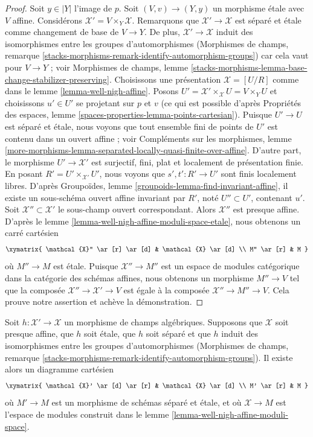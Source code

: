 \begin{proof}
\medskip\noindent
Soit $y \in |Y|$ l'image de $p$.
Soit $(V, v) \to (Y, y)$ un morphisme \'etale avec $V$ affine.
Considérons $\mathcal{X}' = V \times_Y \mathcal{X}$.
Remarquons que $\mathcal{X}' \to \mathcal{X}$ est séparé et \'etale
comme changement de base de $V \to Y$. De plus, $\mathcal{X}' \to \mathcal{X}$
induit des isomorphismes entre les groupes d'automorphismes
(Morphismes de champs, remarque
\ref{stacks-morphisms-remark-identify-automorphism-groups})
car cela vaut pour
$V \to Y$ ; voir Morphismes de champs, lemme
\ref{stacks-morphisms-lemma-base-change-stabilizer-preserving}.
Choisissons une présentation $\mathcal{X} = [U/R]$
comme dans le lemme \ref{lemma-well-nigh-affine}.
Posons $U' = \mathcal{X}' \times_\mathcal{X} U = V \times_Y U$
et choisissons $u' \in U'$ se projetant sur $p$ et $v$ (ce qui est possible
d'après Propriétés des espaces, lemme \ref{spaces-properties-lemma-points-cartesian}).
Puisque $U' \to U$ est séparé et \'etale, nous voyons que
tout ensemble fini de points de $U'$ est contenu dans un ouvert affine ; voir
Compléments sur les morphismes, lemme
\ref{more-morphisms-lemma-separated-locally-quasi-finite-over-affine}.
D'autre part, le morphisme $U' \to \mathcal{X}'$ est
surjectif, fini, plat et localement de présentation finie.
En posant $R' = U' \times_{\mathcal{X}'} U'$, nous voyons
que $s', t' : R' \to U'$ sont finis localement libres.
D'après Groupoïdes, lemme \ref{groupoids-lemma-find-invariant-affine},
il existe un sous-schéma ouvert affine invariant par $R'$, noté $U'' \subset U'$,
contenant $u'$.
Soit $\mathcal{X}'' \subset \mathcal{X}'$ le
sous-champ ouvert correspondant. Alors $\mathcal{X}''$ est
presque affine. D'après le lemme \ref{lemma-well-nigh-affine-moduli-space-etale},
nous obtenons un carré cartésien
$$
\xymatrix{
\mathcal{X}'' \ar[r] \ar[d] & \mathcal{X} \ar[d] \\
M'' \ar[r] & M
}
$$
où $M'' \to M$ est \'etale. Puisque $\mathcal{X}'' \to M''$ est
un espace de modules catégorique dans la catégorie des schémas affines,
nous obtenons un morphisme $M'' \to V$ tel que la composée
$\mathcal{X}'' \to \mathcal{X}' \to V$ est égale à la composée
$\mathcal{X}'' \to M'' \to V$. Cela prouve notre assertion et achève
la démonstration.
\end{proof}

\begin{lemma}
\label{lemma-etale-separated-over-well-nigh-affine}
Soit $h : \mathcal{X}' \to \mathcal{X}$ un morphisme de champs algébriques.
Supposons que $\mathcal{X}$ soit presque affine, que $h$ soit \'etale, que $h$ soit séparé
et que $h$ induit des isomorphismes entre les groupes d'automorphismes
(Morphismes de champs, remarque
\ref{stacks-morphisms-remark-identify-automorphism-groups}).
Il existe alors un diagramme cartésien
$$
\xymatrix{
\mathcal{X}' \ar[d] \ar[r] & \mathcal{X} \ar[d] \\
M' \ar[r] & M
}
$$
où $M' \to M$ est un morphisme de schémas séparé et \'etale, et où
$\mathcal{X} \to M$ est l'espace de modules construit dans le
lemme \ref{lemma-well-nigh-affine-moduli-space}.
\end{lemma}

